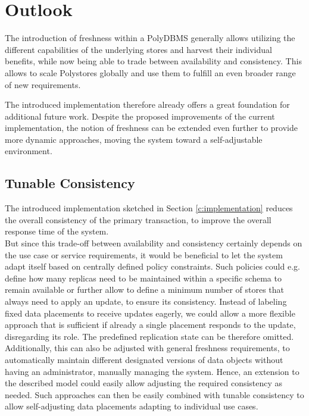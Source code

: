 \chapter{Outlook}
\label{c:outlook}

The introduction of freshness within a PolyDBMS generally allows utilizing the different capabilities
of the underlying stores and harvest their individual benefits,
while now being able to trade between availability and consistency.
This allows to scale Polystores globally and use them to fulfill an even broader range of new requirements.

The introduced implementation therefore already offers a great foundation for additional future work.
Despite the proposed improvements of the current implementation, the notion of freshness can be extended even further to provide more dynamic approaches,
moving the system toward a self-adjustable environment.




\tocless\section{Tunable Consistency}
The introduced implementation sketched in Section \ref{c:implementation} reduces the overall consistency of the primary transaction,
to improve the overall response time of the system.\\ 
But since this trade-off between availability and consistency certainly depends on the use case or service requirements, it would be beneficial
to let the system adapt itself based on centrally defined policy constraints. Such policies could e.g. define how many replicas need to be maintained within a specific 
schema to remain available or further allow to define a minimum number of stores that always need to apply an update, to ensure its consistency.
Instead of labeling fixed data placements to receive updates eagerly, we could allow a more flexible approach that is sufficient if already a single placement 
responds to the update, disregarding its role. 
The predefined replication state can be therefore omitted. 
Additionally, this can also be adjusted with general freshness requirements, to automatically maintain different designated versions of data objects 
without having an administrator, manually managing the system.
Hence, an extension to the described model could easily allow adjusting the required consistency as needed.
Such approaches can then be easily combined with tunable consistency to allow self-adjusting data placements adapting to individual use cases.\\


